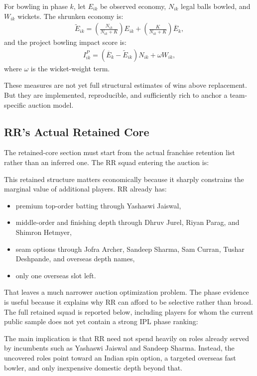 \documentclass[11pt]{article}
\begin{document}
For bowling in phase \(k\), let \(E_{ik}\) be observed economy, \(N_{ik}\) legal balls bowled, and \(W_{ik}\) wickets. The shrunken economy is:
\begin{align}
\widetilde{E}_{ik}
=
\left(\frac{N_{ik}}{N_{ik}+K}\right)E_{ik}
+
\left(\frac{K}{N_{ik}+K}\right)\overline{E}_{k},
\end{align}
and the project bowling impact score is:
\begin{align}
I_{ik}^{P}
=
(\overline{E}_{k}-\widetilde{E}_{ik})N_{ik}+\omega W_{ik},
\end{align}
where \(\omega\) is the wicket-weight term.

These measures are not yet full structural estimates of wins above replacement. But they are implemented, reproducible, and sufficiently rich to anchor a team-specific auction model.

\subsection{RR's Actual Retained Core}

The retained-core section must start from the actual franchise retention list rather than an inferred one. The RR squad entering the auction is:



This retained structure matters economically because it sharply constrains the marginal value of additional players. RR already has:
\begin{itemize}[leftmargin=1.5em]
    \item premium top-order batting through Yashaswi Jaiswal,
    \item middle-order and finishing depth through Dhruv Jurel, Riyan Parag, and Shimron Hetmyer,
    \item seam options through Jofra Archer, Sandeep Sharma, Sam Curran, Tushar Deshpande, and overseas depth names,
    \item only one overseas slot left.
\end{itemize}

That leaves a much narrower auction optimization problem. The phase evidence is useful because it explains why RR can afford to be selective rather than broad. The full retained squad is reported below, including players for whom the current public sample does not yet contain a strong IPL phase ranking:



The main implication is that RR need not spend heavily on roles already served by incumbents such as Yashaswi Jaiswal and Sandeep Sharma. Instead, the uncovered roles point toward an Indian spin option, a targeted overseas fast bowler, and only inexpensive domestic depth beyond that.
\end{document}
